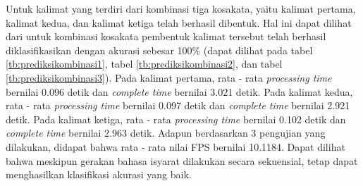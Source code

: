 
Untuk kalimat yang terdiri dari kombinasi tiga kosakata, yaitu kalimat pertama, kalimat kedua, dan kalimat ketiga telah berhasil dibentuk. Hal ini dapat dilihat dari untuk kombinasi kosakata pembentuk kalimat tersebut telah berhasil diklasifikasikan dengan akurasi sebesar 100\% (dapat dilihat pada tabel \ref{tb:prediksikombinasi1}, tabel \ref{tb:prediksikombinasi2}, dan tabel \ref{tb:prediksikombinasi3}). Pada kalimat pertama, rata - rata \emph{processing time} bernilai 0.096 detik dan \emph{complete time} bernilai 3.021 detik. Pada kalimat kedua, rata - rata \emph{processing time} bernilai 0.097 detik dan \emph{complete time} bernilai 2.921 detik. Pada kalimat ketiga, rata - rata \emph{processing time} bernilai 0.102 detik dan \emph{complete time} bernilai 2.963 detik. Adapun berdasarkan 3 pengujian yang dilakukan, didapat bahwa rata - rata nilai FPS bernilai 10.1184. Dapat dilihat bahwa meskipun gerakan bahasa isyarat dilakukan secara sekuensial, tetap dapat menghasilkan klasifikasi akurasi yang baik. 

